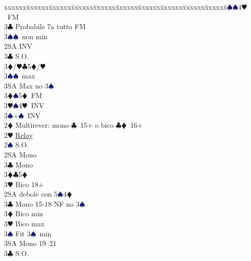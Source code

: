 \documentclass[a4paper,italian]{article}
\newcommand{\BC}{\textcolor{OliveGreen}{$\clubsuit$}}
\newcommand{\BD}{\textcolor{RedOrange}{$\vardiamondsuit$}}
\newcommand{\BH}{\textcolor{Red2}{$\varheartsuit${}}}
\newcommand{\BS}{\textcolor{MidnightBlue}{$\spadesuit${}}}
\newenvironment{bidtable}
{\begin{tabbing}

    xxxxxx\=xxxxxx\=xxxxxx\=xxxxxx\=xxxxxx\=xxxxxx\=xxxxxx\=xxxxxx\=xxxxxx\=xxxxxx\=\kill}
{\end{tabbing} }%
\begin{document}
\begin{multicols}{2}
\begin{bidtable}
                                        3\BS {}\BS 4\BH\ FM\-\\
                                        3\BC \> Probabile 7a tutto FM\\
                                        3\BS {}\BS\ non min\-\\
                                        2SA \> INV\+\\
                                        3\BC \> S.O.\\
                                        3\BD/\BH {}\BC 5\BD /\BH \\
                                        3\BS {}\BS\ max\\
                                        3SA \> Max no 3\BS \-\\
                                        3\BD {}\BS 5\BD\ FM\\
                                        3\BH {}\BS 4\BH\ INV\\
                                        3\BS {}+\BS\ INV\-\\
                                        2\BD \> Multirever: mono \BC\ 15+ o bico \BC \BD\ 16+\+\\
                                        2\BH \> \hyperref[multirever]{Relay}\\
                                        2\BS \> S.O.\+\\
                                        2SA\> Mono\\
                                        3\BC \> Mono\\
                                        3\BD {}\BC 5\BD \\
                                        3\BH \> Bico 18+\-\\
                                        2SA \> debole con 5\BS 4\BD \+\\
                                        3\BC \> Mono 15-18 NF no 3\BS\\
                                        3\BD \> Bico min\\
                                        3\BH \> Bico max\\
                                        3\BS \> Fit 3\BS\ min\\
                                        3SA \> Mono 19--21\-\\
                                        3\BC \> S.O.\\

\end{bidtable}
\end{multicols}
\end{document}
